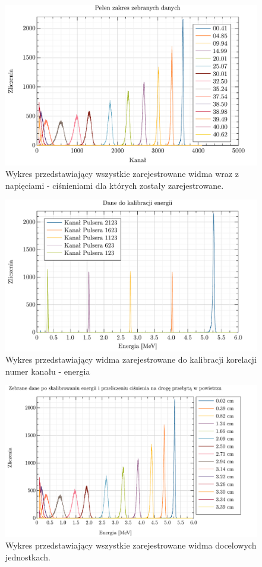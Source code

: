 \documentclass[12pt,a4paper]{article}
\begin{document}
\begin{figure}[h!]
    \centering
    \includegraphics[keepaspectratio, width=0.8\linewidth]{peaks.pdf}
    \caption{Wykres przedstawiający wszystkie zarejestrowane widma wraz z napięciami - ciśnieniami dla których zostały zarejestrowane.}
    \label{fig:wyniki_raw}
\end{figure}

\begin{figure}[h!]
    \centering
    \includegraphics[keepaspectratio, width=0.8\linewidth]{peaks_kalibracja_energy.pdf}
    \caption{Wykres przedstawiający widma zarejestrowane do kalibracji korelacji numer kanału - energia}
    \label{fig:kal_energie}
\end{figure}

\begin{figure}[h!]
    \centering
    \includegraphics[keepaspectratio, width=0.8\linewidth]{peaks_energy.pdf}
    \caption{Wykres przedstawiający wszystkie zarejestrowane widma docelowych jednostkach.}
    \label{fig:dane_przeliczone}
\end{figure}
\end{document}
